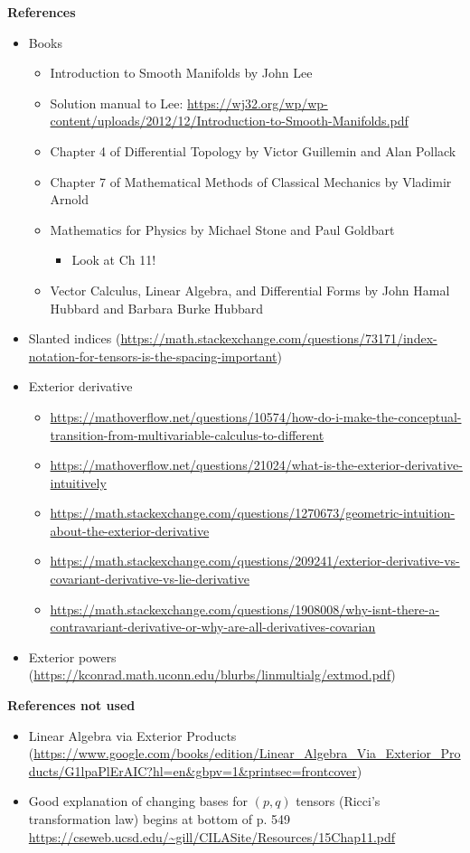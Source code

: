 \textbf{References}
\begin{itemize}
    \item Books
    \begin{itemize}
        \item Introduction to Smooth Manifolds by John Lee
        \item Solution manual to Lee: \url{https://wj32.org/wp/wp-content/uploads/2012/12/Introduction-to-Smooth-Manifolds.pdf}
        \item Chapter 4 of Differential Topology by Victor Guillemin and Alan Pollack
        \item Chapter 7 of Mathematical Methods of Classical Mechanics by Vladimir Arnold
        \item Mathematics for Physics by Michael Stone and Paul Goldbart
        \begin{itemize}
            \item Look at Ch 11!
        \end{itemize}
        \item Vector Calculus, Linear Algebra, and Differential Forms by John Hamal Hubbard and Barbara Burke Hubbard
    \end{itemize}
    \item Slanted indices (\url{https://math.stackexchange.com/questions/73171/index-notation-for-tensors-is-the-spacing-important})
    \item Exterior derivative
    \begin{itemize}
        \item \url{https://mathoverflow.net/questions/10574/how-do-i-make-the-conceptual-transition-from-multivariable-calculus-to-different}
        \item \url{https://mathoverflow.net/questions/21024/what-is-the-exterior-derivative-intuitively}
        \item \url{https://math.stackexchange.com/questions/1270673/geometric-intuition-about-the-exterior-derivative}
        \item \url{https://math.stackexchange.com/questions/209241/exterior-derivative-vs-covariant-derivative-vs-lie-derivative}
        \item \url{https://math.stackexchange.com/questions/1908008/why-isnt-there-a-contravariant-derivative-or-why-are-all-derivatives-covarian}
    \end{itemize}
    \item Exterior powers (\url{https://kconrad.math.uconn.edu/blurbs/linmultialg/extmod.pdf})
\end{itemize}

\textbf{References not used}
\begin{itemize}
    \item Linear Algebra via Exterior Products (\url{https://www.google.com/books/edition/Linear_Algebra_Via_Exterior_Products/G1lpaPlErAIC?hl=en&gbpv=1&printsec=frontcover})
    \item Good explanation of changing bases for $(p, q)$ tensors (Ricci's transformation law) begins at bottom of p. 549 \url{https://cseweb.ucsd.edu/~gill/CILASite/Resources/15Chap11.pdf}
\end{itemize}